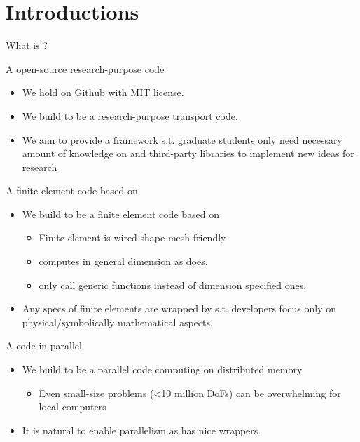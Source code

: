 \section{Introductions}
\begin{frame}{What is ?}
	\begin{block}{A open-source research-purpose code}
		\begin{itemize}
			\item We hold  on Github with MIT license.
			\item We build  to be a research-purpose transport code.
			\item We aim to provide a framework s.t. graduate students only need necessary amount of knowledge on  and third-party libraries to implement new ideas for research
		\end{itemize}
	\end{block}
	\begin{block}{A finite element code based on }
		\begin{itemize}
			\item We build  to be a finite element code based on 
			\begin{itemize}
				\item Finite element is wired-shape mesh friendly
				\item {} computes in general dimension as  does.
				\item {} only call generic functions instead of dimension specified ones.
			\end{itemize}
			\item Any specs of finite elements are wrapped by  s.t.  developers focus only on physical/symbolically mathematical aspects.
		\end{itemize}
	\end{block}
	\begin{block}{A code in parallel}
		\begin{itemize}
			\item We build  to be a parallel code computing on distributed memory
			\begin{itemize}
				\item Even small-size problems (<10 million DoFs) can be overwhelming for local computers
			\end{itemize}
			\item It is natural to enable parallelism as  has nice wrappers.
		\end{itemize}
	\end{block}
\end{frame}

